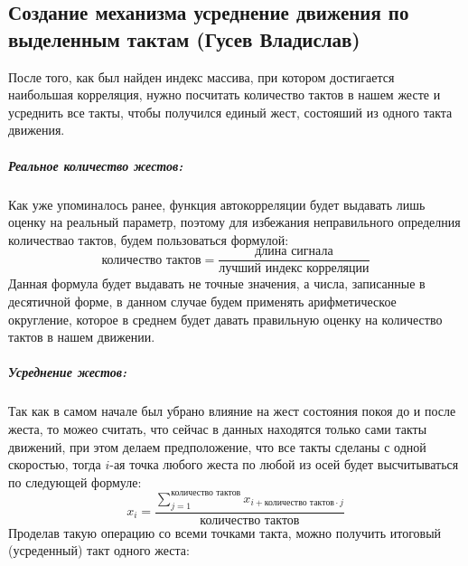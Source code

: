 \subsection{Создание механизма усреднение движения по выделенным тактам (Гусев Владислав)}
После того, как был найден индекс массива, при котором достигается наибольшая корреляция, нужно посчитать количество тактов в нашем жесте и усреднить все такты, чтобы получился единый жест, состояший из одного такта движения.

\subparagraph{Реальное количество жестов:}
Как уже упоминалось ранее, функция автокорреляции будет выдавать лишь оценку на реальный параметр, поэтому для избежания неправильного определния количествао тактов, будем пользоваться формулой:
\[\text{количество тактов} = \dfrac{\text{длина сигнала}}{\text{лучший индекс корреляции}}\]
Данная формула будет выдавать не точные значения, а числа, записанные в десятичной форме, в данном случае будем применять арифметическое округление, которое в среднем будет давать правильную оценку на количество тактов в нашем движении.
\subparagraph{Усреднение жестов:}
Так как в самом начале был убрано влияние на жест состояния покоя до и после жеста, то можео считать, что сейчас в данных находятся только сами такты движений, при этом делаем предположение, что все такты сделаны с одной скоростью, тогда $i$-ая точка любого жеста по любой из осей будет высчитываться по следующей формуле:
\[x_i = \dfrac{\sum_{j = 1}^{\text{количество тактов}} x_{i + \text{количество тактов} \cdot j}}{\text{количество тактов}}\]
Проделав такую операцию со всеми точками такта, можно получить итоговый (усреденный) такт одного жеста:

\begin{figure}[H]
\end{figure}

